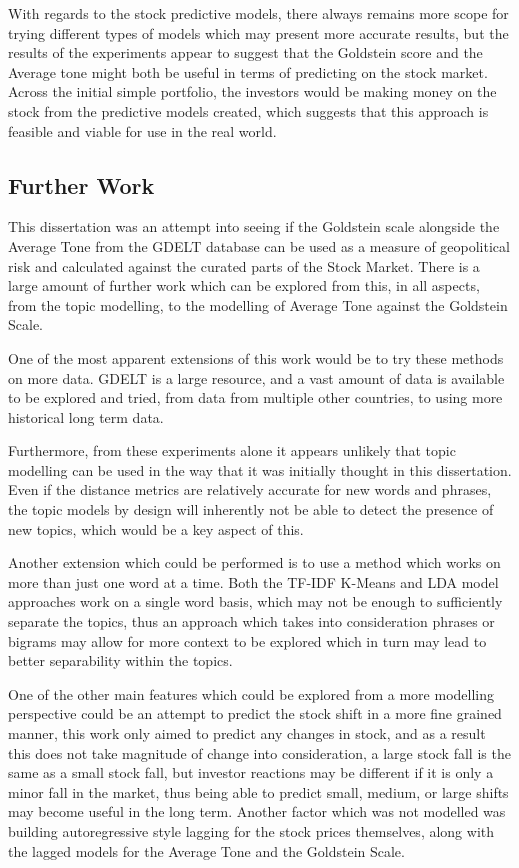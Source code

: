 With regards to the stock predictive models, there always remains more scope for trying different types of models which may present more accurate results, but the results of the experiments appear to suggest that the Goldstein score and the Average tone might both be useful in terms of predicting on the stock market. Across the initial simple portfolio, the investors would be making money on the stock from the predictive models created, which suggests that this approach is feasible and viable for use in the real world.

\subsection{Further Work}
This dissertation was an attempt into seeing if the Goldstein scale alongside the Average Tone from the GDELT database can be used as a measure of geopolitical risk and calculated against the curated parts of the Stock Market. There is a large amount of further work which can be explored from this, in all aspects, from the topic modelling, to the modelling of Average Tone against the Goldstein Scale. 

One of the most apparent extensions of this work would be to try these methods on more data. GDELT is a large resource, and a vast amount of data is available to be explored and tried, from data from multiple other countries, to using more historical long term data. 

Furthermore, from these experiments alone it appears unlikely that topic modelling can be used in the way that it was initially thought in this dissertation. Even if the distance metrics are relatively accurate for new words and phrases, the topic models by design will inherently not be able to detect the presence of new topics, which would be a key aspect of this.

Another extension which could be performed is to use a method which works on more than just one word at a time. Both the TF-IDF K-Means and LDA model approaches work on a single word basis, which may not be enough to sufficiently separate the topics, thus an approach which takes into consideration phrases or bigrams may allow for more context to be explored which in turn may lead to better separability within the topics. 

One of the other main features which could be explored from a more modelling perspective could be an attempt to predict the stock shift in a more fine grained manner, this work only aimed to predict any changes in stock, and as a result this does not take magnitude of change into consideration, a large stock fall is the same as a small stock fall, but investor reactions may be different if it is only a minor fall in the market, thus being able to predict small, medium, or large shifts may become useful in the long term. Another factor which was not modelled was building autoregressive style lagging for the stock prices themselves, along with the lagged models for the Average Tone and the Goldstein Scale. 


